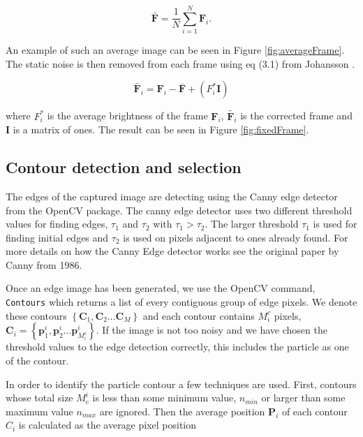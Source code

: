 \begin{equation}\label{eq:averageFrame}
\bar{\mathbf{F}} = \frac{1}{N}\sum\limits_{i=1}^{N} \mathbf{F}_i.
\end{equation}

\noindent An example of such an average image can be seen in Figure \ref{fig:averageFrame}. The static noise is then removed from each frame using eq (3.1) from Johansson \cite{AntonThesis}.

\begin{equation}
\widetilde{\mathbf{F}_{i}} = \mathbf{F}_i - \bar{\mathbf{F}} + (F_i^*\mathbf{I})
\end{equation}

\noindent where $F_i^*$ is the average brightness of the frame $\mathbf{F}_i$, $\widetilde{\mathbf{F}_{i}}$ is the corrected frame and $\mathbf{I}$ is a matrix of ones. The result can be seen in Figure \ref{fig:fixedFrame}. 




\subsection{Contour detection and selection}
The edges of the captured image are detecting using the Canny edge detector from the OpenCV package. The canny edge detector uses two different threshold values for finding edges, $\tau_1$ and $\tau_2$ with $\tau_1 > \tau_2$. The larger threshold $\tau_1$ is used for finding initial edges and $\tau_2$ is used on pixels adjacent to ones already found. For more details on how the Canny Edge detector works see the original paper by Canny from 1986\cite{Canny}. 

Once an edge image has been generated, we use the OpenCV command, \texttt{Contours} which returns a list of every contiguous group of edge pixels.  We denote these contours $\left\{\mathbf{C}_1, \mathbf{C}_2 \ldots \mathbf{C}_M \right\}$ and each contour contains $M^c_i$ pixels, $\mathbf{C}_i = \left\{\mathbf{p}^i_1, \mathbf{p}^i_2 \ldots \mathbf{p}^i_{M^c_i}\right\} $. If the image is not too noisy and we have chosen the threshold values to the edge detection correctly, this includes the particle as one of the contour. 

In order to identify the particle contour  a few techniques are used. First, contours whose total size $ M_c^i$ is less than some minimum value, $ n_{min}$ or larger than some maximum value $n_{max}$ are ignored. Then the average position $\mathbf{P}_i$ of each contour $C_i$ is calculated as the average pixel position

